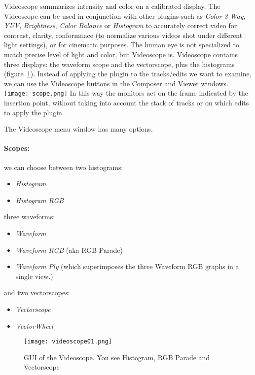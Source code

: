 Videoscope summarizes intensity and color on a calibrated display. The Videoscope can be used in conjunction with other \CGG{} plugins such as \textit{Color 3 Way}, \textit{YUV}, \textit{Brightness}, \textit{Color Balance} or \textit{Histogram} to accurately correct video for contrast, clarity, conformance (to normalize various videos shot under different light settings), or for cinematic purposes. The human eye is not specialized to match precise level of light and color, but Videoscope is. Videoscope contains three displays: the waveform scope and the vectorscope, plus the histograms (figure~\ref{fig:videoscope01}). Instead of applying the plugin to the tracks/edits we want to examine, we can use the Videoscope buttons in the Composer and Viewer windows. \texttt{[image: scope.png]} In this way the monitors act on the frame indicated by the insertion point, without taking into account the stack of tracks or on which edits to apply the plugin.

The Videoscope menu window has many options.

\paragraph*{Scopes:} we can choose between two histograms:

\begin{itemize}[noitemsep]
	\item \textit{Histogram}
	\item \textit{Histogram RGB}
\end{itemize}
three waveforms: 
\begin{itemize}[noitemsep]
	\item \textit{Waveform}
	\item \textit{Waveform RGB} (aka RGB Parade)
	\item \textit{Waveform Ply} (which superimposes the three Waveform RGB graphs in a single view.)
\end{itemize}
and two vectorscopes: 
\begin{itemize}[noitemsep]
	\item \textit{Vectorscope}
	\item \textit{VectorWheel}
\end{itemize}

\begin{figure}[hbtp]
	\centering
	\texttt{[image: videoscope01.png]}
	\caption{GUI of the Videoscope. You see Histogram, RGB Parade and Vectorscope}
	\label{fig:videoscope01}
\end{figure}

